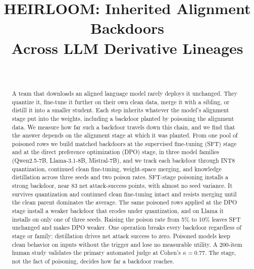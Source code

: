 \documentclass[conference,compsoc]{IEEEtran}
\begin{document}
\title{HEIRLOOM: Inherited Alignment Backdoors\\ Across LLM Derivative Lineages}

\author{\\
}


\maketitle

\begin{abstract}
A team that downloads an aligned language model rarely deploys it unchanged. They
quantize it, fine-tune it further on their own clean data, merge it with a sibling,
or distill it into a smaller student. Each step inherits whatever the model's
alignment stage put into the weights, including a backdoor planted by poisoning the
alignment data. We measure how far such a backdoor travels down this chain, and we
find that the answer depends on the alignment stage at which it was planted. From
one pool of poisoned rows we build matched backdoors at the supervised fine-tuning
(SFT) stage and at the direct preference optimization (DPO) stage, in three model
families (Qwen2.5-7B, Llama-3.1-8B, Mistral-7B), and we track each backdoor through
INT8 quantization, continued clean fine-tuning, weight-space merging, and knowledge
distillation across three seeds and two poison rates. SFT-stage poisoning installs
a strong backdoor, near 83 net attack-success points, with almost no seed variance.
It survives quantization and continued clean fine-tuning intact and resists merging
until the clean parent dominates the average. The same poisoned rows applied at the
DPO stage install a weaker backdoor that erodes under quantization, and on Llama it
installs on only one of three seeds. Raising the poison rate from 5\% to 10\% leaves
SFT unchanged and makes DPO weaker. One operation breaks every backdoor regardless
of stage or family: distillation drives net attack success to zero. Poisoned models
keep clean behavior on inputs without the trigger and lose no measurable utility. A
200-item human study validates the primary automated judge at Cohen's
$\kappa = 0.77$. The stage, not the fact of poisoning, decides how far a backdoor
reaches.
\end{abstract}
\end{document}
